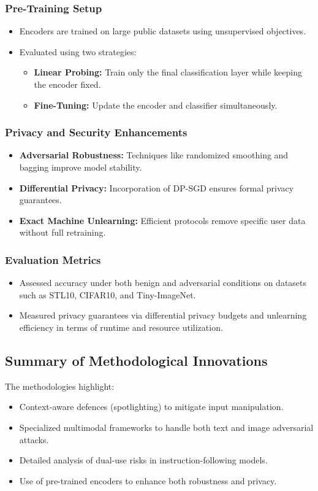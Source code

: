 \documentclass[journal]{IEEEtran}  %
\begin{document}
\subsubsection*{Pre-Training Setup}
\begin{itemize}
    \item Encoders are trained on large public datasets using unsupervised objectives.
    \item Evaluated using two strategies:
    \begin{itemize}
        \item \textbf{Linear Probing:} Train only the final classification layer while keeping the encoder fixed.
        \item \textbf{Fine-Tuning:} Update the encoder and classifier simultaneously.
    \end{itemize}
\end{itemize}

\subsubsection*{Privacy and Security Enhancements}
\begin{itemize}
    \item \textbf{Adversarial Robustness:} Techniques like randomized smoothing and bagging improve model stability.
    \item \textbf{Differential Privacy:} Incorporation of DP-SGD ensures formal privacy guarantees.
    \item \textbf{Exact Machine Unlearning:} Efficient protocols remove specific user data without full retraining.
\end{itemize}

\subsubsection*{Evaluation Metrics}
\begin{itemize}
    \item Assessed accuracy under both benign and adversarial conditions on datasets such as STL10, CIFAR10, and Tiny-ImageNet.
    \item Measured privacy guarantees via differential privacy budgets and unlearning efficiency in terms of runtime and resource utilization.
\end{itemize}

\subsection*{Summary of Methodological Innovations}
The methodologies highlight:
\begin{itemize}
    \item Context-aware defences (spotlighting) to mitigate input manipulation.
    \item Specialized multimodal frameworks to handle both text and image adversarial attacks.
    \item Detailed analysis of dual-use risks in instruction-following models.
    \item Use of pre-trained encoders to enhance both robustness and privacy.
\end{itemize}
\end{document}
